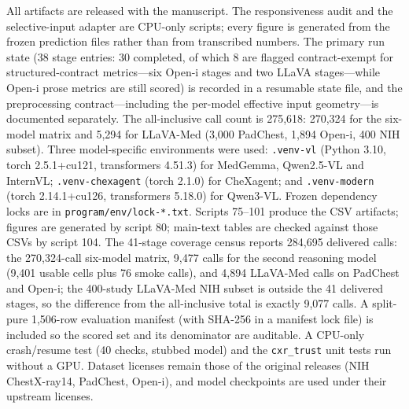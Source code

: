 All artifacts are released with the manuscript. The responsiveness audit and the selective-input adapter are CPU-only scripts; every figure is generated from the frozen prediction files rather than from transcribed numbers. The primary run state (38 stage entries: 30 completed, of which 8 are flagged contract-exempt for structured-contract metrics---six Open-i stages and two LLaVA stages---while Open-i prose metrics are still scored) is recorded in a resumable state file, and the preprocessing contract---including the per-model effective input geometry---is documented separately. The all-inclusive call count is 275,618: 270,324 for the six-model matrix and 5,294 for LLaVA-Med (3,000 PadChest, 1,894 Open-i, 400 NIH subset). Three model-specific environments were used: \texttt{.venv-vl} (Python 3.10, torch 2.5.1+cu121, transformers 4.51.3) for MedGemma, Qwen2.5-VL and InternVL; \texttt{.venv-chexagent} (torch 2.1.0) for CheXagent; and \texttt{.venv-modern} (torch 2.14.1+cu126, transformers 5.18.0) for Qwen3-VL. Frozen dependency locks are in \texttt{program/env/lock-*.txt}. Scripts 75--101 produce the CSV artifacts; figures are generated by script 80; main-text tables are checked against those CSVs by script 104. The 41-stage coverage census reports 284,695 delivered calls: the 270,324-call six-model matrix, 9,477 calls for the second reasoning model (9,401 usable cells plus 76 smoke calls), and 4,894 LLaVA-Med calls on PadChest and Open-i; the 400-study LLaVA-Med NIH subset is outside the 41 delivered stages, so the difference from the all-inclusive total is exactly 9,077 calls. A split-pure 1,506-row evaluation manifest (with SHA-256 in a manifest lock file) is included so the scored set and its denominator are auditable. A CPU-only crash/resume test (40 checks, stubbed model) and the \texttt{cxr\_trust} unit tests run without a GPU. Dataset licenses remain those of the original releases (NIH ChestX-ray14, PadChest, Open-i), and model checkpoints are used under their upstream licenses.
